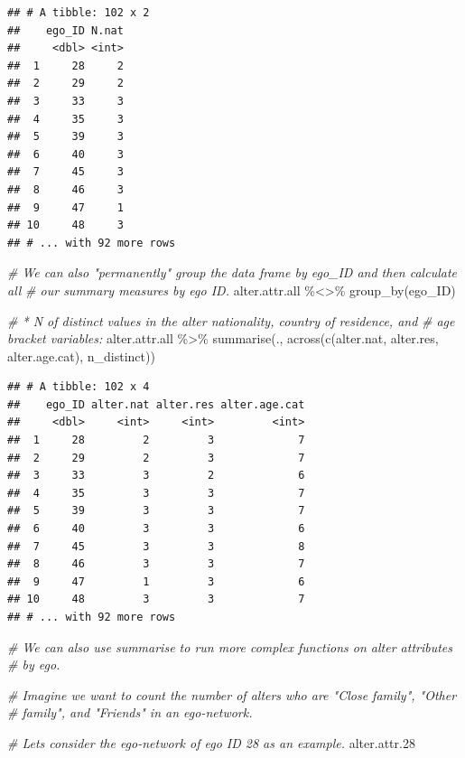 \documentclass[
]{book}
\newenvironment{Shaded}{\begin{snugshade}}{\end{snugshade}}
\newcommand{\CommentTok}[1]{\textcolor[rgb]{0.56,0.35,0.01}{\textit{#1}}}
\newcommand{\FloatTok}[1]{\textcolor[rgb]{0.00,0.00,0.81}{#1}}
\newcommand{\FunctionTok}[1]{\textcolor[rgb]{0.00,0.00,0.00}{#1}}
\newcommand{\NormalTok}[1]{#1}
\newcommand{\SpecialCharTok}[1]{\textcolor[rgb]{0.00,0.00,0.00}{#1}}
\begin{document}
\begin{verbatim}
## # A tibble: 102 x 2
##    ego_ID N.nat
##     <dbl> <int>
##  1     28     2
##  2     29     2
##  3     33     3
##  4     35     3
##  5     39     3
##  6     40     3
##  7     45     3
##  8     46     3
##  9     47     1
## 10     48     3
## # ... with 92 more rows
\end{verbatim}

\begin{Shaded}
\begin{Highlighting}[]
\CommentTok{\# We can also "permanently" group the data frame by ego\_ID and then calculate all}
\CommentTok{\# our summary measures by ego ID.}
\NormalTok{alter.attr.all }\SpecialCharTok{\%\textless{}\textgreater{}\%} 
  \FunctionTok{group\_by}\NormalTok{(ego\_ID)}

\CommentTok{\# * N of distinct values in the alter nationality, country of residence, and}
\CommentTok{\# age bracket variables:}
\NormalTok{alter.attr.all }\SpecialCharTok{\%\textgreater{}\%}
  \FunctionTok{summarise}\NormalTok{(., }\FunctionTok{across}\NormalTok{(}\FunctionTok{c}\NormalTok{(alter.nat, alter.res, alter.age.cat), n\_distinct))}
\end{Highlighting}
\end{Shaded}

\begin{verbatim}
## # A tibble: 102 x 4
##    ego_ID alter.nat alter.res alter.age.cat
##     <dbl>     <int>     <int>         <int>
##  1     28         2         3             7
##  2     29         2         3             7
##  3     33         3         2             6
##  4     35         3         3             7
##  5     39         3         3             7
##  6     40         3         3             6
##  7     45         3         3             8
##  8     46         3         3             7
##  9     47         1         3             6
## 10     48         3         3             7
## # ... with 92 more rows
\end{verbatim}

\begin{Shaded}
\begin{Highlighting}[]
\CommentTok{\# We can also use summarise to run more complex functions on alter attributes}
\CommentTok{\# by ego.}

\CommentTok{\# Imagine we want to count the number of alters who are "Close family", "Other}
\CommentTok{\# family", and "Friends" in an ego{-}network.}

\CommentTok{\# Let\textquotesingle{}s consider the ego{-}network of ego ID 28 as an example.}
\NormalTok{alter.attr}\FloatTok{.28}
\end{Highlighting}
\end{Shaded}
\end{document}
